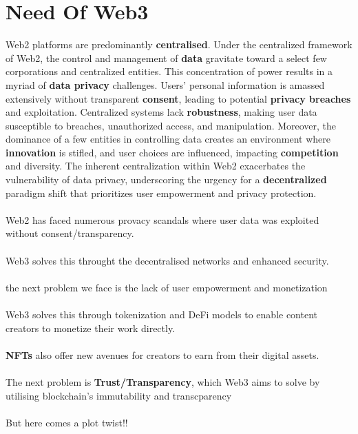 \documentclass[a4paper,30pt]{report}
\begin{document}
      \section{Need Of Web3} 
          Web2 platforms are predominantly \textbf{centralised}. Under the centralized framework of Web2, the control and management of \textbf{data} gravitate toward a select few corporations and centralized entities. This concentration of power results in a myriad of \textbf{data privacy} challenges. Users' personal information is amassed extensively without transparent \textbf{consent}, leading to potential \textbf{privacy breaches} and exploitation. Centralized systems lack \textbf{robustness}, making user data susceptible to breaches, unauthorized access, and manipulation. Moreover, the dominance of a few entities in controlling data creates an environment where \textbf{innovation} is stifled, and user choices are influenced, impacting \textbf{competition} and diversity. The inherent centralization within Web2 exacerbates the vulnerability of data privacy, underscoring the urgency for a \textbf{decentralized} paradigm shift that prioritizes user empowerment and privacy protection.\\\\
          Web2 has faced numerous provacy scandals where user data was exploited without consent/transparency.\\\\
          Web3 solves this throught the decentralised networks and enhanced security.\\\\
          the next problem we face is the lack of user empowerment and monetization\\\\

          Web3 solves this through tokenization and DeFi models to enable content creators to monetize their work directly.\\\\
          \textbf{NFTs} also offer new avenues for creators to earn from their digital assets.\\\\

          The next problem is \textbf{Trust/Transparency}, which Web3 aims to solve by utilising blockchain's immutability and transcparency\\\\

          But here comes a plot twist!!\\\\
\end{document}
